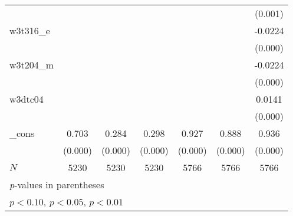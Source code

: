 {\begin{tabular}{l*{6}{c}}
            &                     &                     &                     &                     &                     &     (0.001)         \\
[1em]
w3t316\_e    &                     &                     &                     &                     &                     &     -0.0224\sym{***}\\
            &                     &                     &                     &                     &                     &     (0.000)         \\
[1em]
w3t204\_m    &                     &                     &                     &                     &                     &     -0.0224\sym{***}\\
            &                     &                     &                     &                     &                     &     (0.000)         \\
[1em]
w3dtc04     &                     &                     &                     &                     &                     &      0.0141\sym{***}\\
            &                     &                     &                     &                     &                     &     (0.000)         \\
[1em]
\_cons      &       0.703\sym{***}&       0.284\sym{***}&       0.298\sym{***}&       0.927\sym{***}&       0.888\sym{***}&       0.936\sym{***}\\
            &     (0.000)         &     (0.000)         &     (0.000)         &     (0.000)         &     (0.000)         &     (0.000)         \\
\hline
\(N\)       &        5230         &        5230         &        5230         &        5766         &        5766         &        5766         \\
\hline\hline
\multicolumn{7}{l}{\footnotesize \textit{p}-values in parentheses}\\
\multicolumn{7}{l}{\footnotesize \sym{*} \(p<0.10\), \sym{**} \(p<0.05\), \sym{***} \(p<0.01\)}\\
\end{tabular}
}
